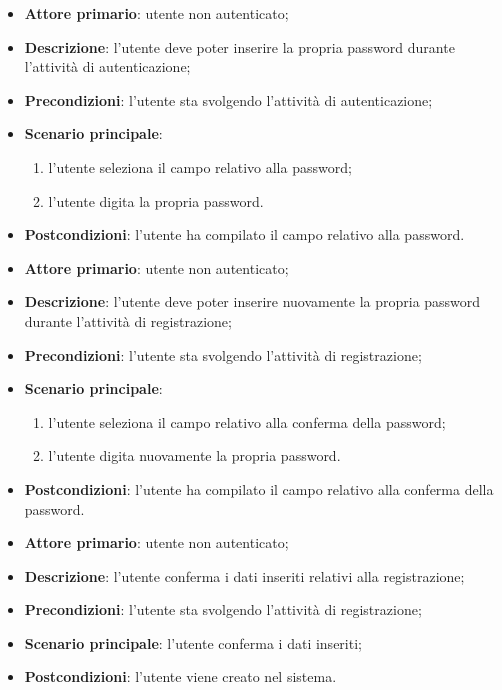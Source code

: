 \label{uc:signup_pw}
\begin{itemize}
    \item \textbf{Attore primario}: utente non autenticato;
    \item \textbf{Descrizione}: l'utente deve poter inserire la propria password durante l'attività di autenticazione;
    \item \textbf{Precondizioni}: l'utente sta svolgendo l'attività di autenticazione;
    \item \textbf{Scenario principale}:
    \begin{enumerate}
        \item l'utente seleziona il campo relativo alla password;
        \item l'utente digita la propria password.
    \end{enumerate}
    \item \textbf{Postcondizioni}: l'utente ha compilato il campo relativo alla password.
\end{itemize}

\label{uc:signup_conferma_pw}
\begin{itemize}
    \item \textbf{Attore primario}: utente non autenticato;
    \item \textbf{Descrizione}: l'utente deve poter inserire nuovamente la propria password durante l'attività di registrazione;
    \item \textbf{Precondizioni}: l'utente sta svolgendo l'attività di registrazione;
    \item \textbf{Scenario principale}:
    \begin{enumerate}
        \item l'utente seleziona il campo relativo alla conferma della password;
        \item l'utente digita nuovamente la propria password.
    \end{enumerate}
    \item \textbf{Postcondizioni}: l'utente ha compilato il campo relativo alla conferma della password.
\end{itemize}

\label{uc:signup_conferma}
\begin{itemize}
	\item \textbf{Attore primario}: utente non autenticato;
	\item \textbf{Descrizione}: l'utente conferma i dati inseriti relativi alla registrazione;
	\item \textbf{Precondizioni}: l'utente sta svolgendo l'attività di registrazione;
	\item \textbf{Scenario principale}: l'utente conferma i dati inseriti;
	\item \textbf{Postcondizioni}: l'utente viene creato nel sistema.
\end{itemize}

